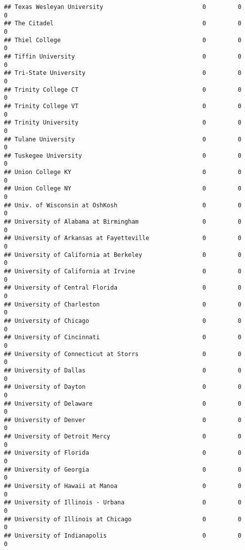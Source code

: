 \documentclass[
]{article}
\begin{document}
\begin{verbatim}
## Texas Wesleyan University                            0         0           0
## The Citadel                                          0         0           0
## Thiel College                                        0         0           0
## Tiffin University                                    0         0           0
## Tri-State University                                 0         0           0
## Trinity College CT                                   0         0           0
## Trinity College VT                                   0         0           0
## Trinity University                                   0         0           0
## Tulane University                                    0         0           0
## Tuskegee University                                  0         0           0
## Union College KY                                     0         0           0
## Union College NY                                     0         0           0
## Univ. of Wisconsin at OshKosh                        0         0           0
## University of Alabama at Birmingham                  0         0           0
## University of Arkansas at Fayetteville               0         0           0
## University of California at Berkeley                 0         0           0
## University of California at Irvine                   0         0           0
## University of Central Florida                        0         0           0
## University of Charleston                             0         0           0
## University of Chicago                                0         0           0
## University of Cincinnati                             0         0           0
## University of Connecticut at Storrs                  0         0           0
## University of Dallas                                 0         0           0
## University of Dayton                                 0         0           0
## University of Delaware                               0         0           0
## University of Denver                                 0         0           0
## University of Detroit Mercy                          0         0           0
## University of Florida                                0         0           0
## University of Georgia                                0         0           0
## University of Hawaii at Manoa                        0         0           0
## University of Illinois - Urbana                      0         0           0
## University of Illinois at Chicago                    0         0           0
## University of Indianapolis                           0         0           0

\end{verbatim}
\end{document}
